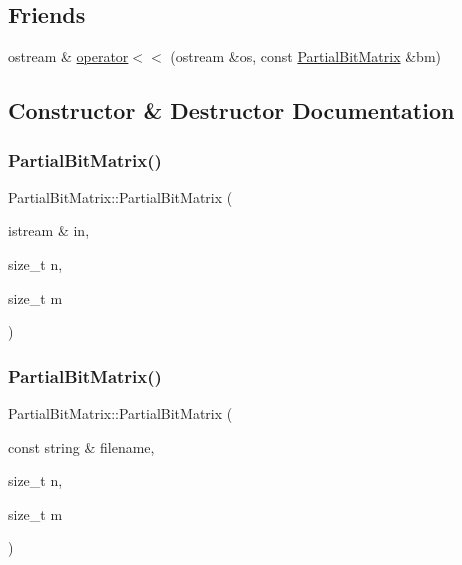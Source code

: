\subsection*{Friends}
\begin{DoxyCompactItemize}
\item 
ostream \& \hyperlink{classPartialBitMatrix_ad47fa6477b5477654c809695f108d52e}{operator$<$$<$} (ostream \&os, const \hyperlink{classPartialBitMatrix}{Partial\+Bit\+Matrix} \&bm)
\end{DoxyCompactItemize}


\subsection{Constructor \& Destructor Documentation}
\mbox{\label{classPartialBitMatrix_a0bdc388b54ece3f0af522140f1d8fa3f}} 
\subsubsection{\texorpdfstring{Partial\+Bit\+Matrix()}{PartialBitMatrix()}\hspace{0.1cm}{\footnotesize\ttfamily [1/2]}}
{\footnotesize\ttfamily Partial\+Bit\+Matrix\+::\+Partial\+Bit\+Matrix (\begin{DoxyParamCaption}\item[{istream \&}]{in,  }\item[{size\+\_\+t}]{n,  }\item[{size\+\_\+t}]{m }\end{DoxyParamCaption})\hspace{0.3cm}{\ttfamily [inline]}}

\mbox{\label{classPartialBitMatrix_a9c57752eb3d83c96694d6016ab51b93f}} 
\subsubsection{\texorpdfstring{Partial\+Bit\+Matrix()}{PartialBitMatrix()}\hspace{0.1cm}{\footnotesize\ttfamily [2/2]}}
{\footnotesize\ttfamily Partial\+Bit\+Matrix\+::\+Partial\+Bit\+Matrix (\begin{DoxyParamCaption}\item[{const string \&}]{filename,  }\item[{size\+\_\+t}]{n,  }\item[{size\+\_\+t}]{m }\end{DoxyParamCaption})\hspace{0.3cm}{\ttfamily [inline]}}



